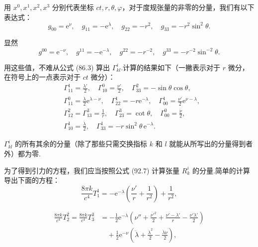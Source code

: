 用 $x^0,x^1,x^2,x^3$ 分别代表坐标 $ct,r,\theta,\varphi$，对于度规张量的非零的分量，我们有以下表达式：
\begin{equation*}
  g_{00}=\mathrm{e}^{\nu},\quad g_{11}=-\mathrm{e}^{\lambda},\quad
  g_{22}=-r^{2},\quad g_{33}=-r^{2}\sin^{2}\theta.
\end{equation*}

显然
\begin{equation*}
  g^{00}=\mathrm{e}^{-\nu},\quad g^{11}=-\mathrm{e}^{-\lambda},\quad
  g^{22}=-r^{-2},\quad g^{33}=-r^{-2}\sin^{-2}\theta.
\end{equation*}

用这些值，不难从公式 (86.3) 算出 $\Gamma_{kl}^i$.计算的结果如下（一撇表示对于 $r$ 微分，在符号上的一点表示对于 $ct$ 微分）：
\begin{equation}
\begin{aligned}
  &\Gamma_{11}^{1}=\frac{\lambda'}{2},\quad
  \Gamma_{10}^{0}=\frac{\nu'}{2},\quad
  \Gamma_{33}^{2}=-\sin\theta\cos\theta,\\
  &\Gamma_{11}^{0}=\frac{\dot{\lambda}}{2}\mathrm{e}^{\lambda-\nu},\quad
  \Gamma_{22}^{1}=-r\mathrm{e}^{-\lambda},\quad
  \Gamma_{00}^{1}=\frac{\nu'}{2}\mathrm{e}^{\nu-\lambda},\\
  &\Gamma_{12}^{2}=\Gamma_{13}^{3}=\frac{1}{r},\quad
  \Gamma_{23}^{3}=\cot\theta,\quad
  \Gamma_{00}^{0}=\frac{\dot{\nu}}{2},\\
  &\Gamma_{10}^{1}=\frac{\dot{\lambda}}{2},\quad
  \Gamma_{33}^{1}=-r\sin^{2}\theta\,\mathrm{e}^{-\lambda}.
\end{aligned}
\end{equation}

$\Gamma_{kl}^i$ 的所有其余的分量（除了那些只需交换指标 $k$ 和 $l$ 就能从所写出的分量得到者外）都为零.

为了得到引力的方程，我们应当按照公式 (92.7) 计算张量 $R_k^i$ 的分量.简单的计算导出下面的方程：
\begin{equation}
  \frac{8\pi k}{c^{4}}T_1^1
  =-\mathrm{e}^{-\lambda}\left(\frac{\nu'}{r}+\frac{1}{r^{2}}\right)
  +\frac{1}{r^{2}},
\end{equation}

\begin{equation}
\begin{aligned}
  \frac{8\pi k}{c^{4}}T_2^2=\frac{8\pi k}{c^{4}}T_3^3
  &=-\frac{1}{2}\mathrm{e}^{-\lambda}
  \left(\nu''+\frac{\nu'^{2}}{2}
  +\frac{\nu'-\lambda'}{r}-\frac{\nu'\lambda'}{2}\right)\\
  &\quad+\frac{1}{2}\mathrm{e}^{-\nu}
  \left(\ddot{\lambda}+\frac{\dot{\lambda}^{2}}{2}
  -\frac{\dot{\lambda}\dot{\nu}}{2}\right),
\end{aligned}
\end{equation}

